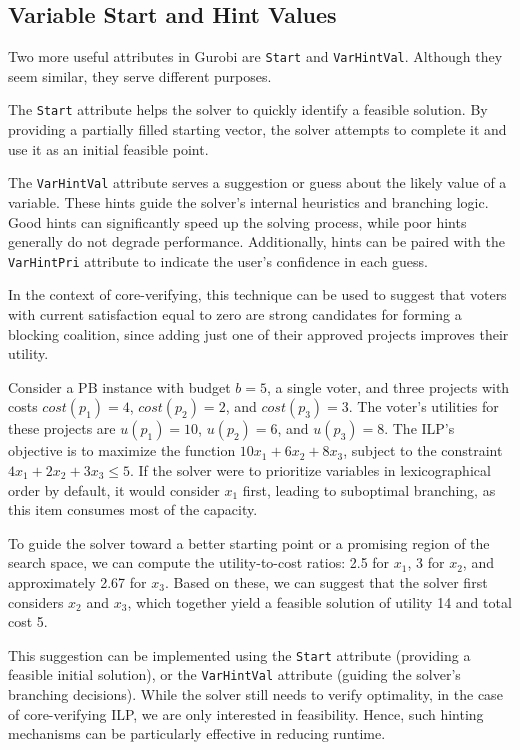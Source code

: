 \documentclass[magisterska,en]{pracamgr}
\begin{document}
\subsection{Variable Start and Hint Values}

Two more useful attributes in Gurobi are \texttt{Start} and \texttt{VarHintVal}. Although they seem similar, they serve different purposes.

The \texttt{Start} attribute helps the solver to quickly identify a feasible solution. By providing a partially filled starting vector, the solver attempts to complete it and use it as an initial feasible point.

The \texttt{VarHintVal} attribute serves a suggestion or guess about the likely value of a variable. These hints guide the solver's internal heuristics and branching logic. Good hints can significantly speed up the solving process, while poor hints generally do not degrade performance. Additionally, hints can be paired with the \texttt{VarHintPri} attribute to indicate the user's confidence in each guess.

In the context of core-verifying, this technique can be used to suggest that voters with current satisfaction equal to zero are strong candidates for forming a blocking coalition, since adding just one of their approved projects improves their utility.

Consider a PB instance with budget $b=5$, a single voter, and three projects with costs $cost(p_1)=4$, $cost(p_2)=2$, and $cost(p_3)=3$. The voter's utilities for these projects are $u(p_1)=10$, $u(p_2)=6$, and $u(p_3)=8$. The ILP's objective is to maximize the function $10x_1+6x_2+8x_3$, subject to the constraint $4x_1+2x_2+3x_3\leq5$. If the solver were to prioritize variables in lexicographical order by default, it would consider $x_1$ first, leading to suboptimal branching, as this item consumes most of the capacity.

To guide the solver toward a better starting point or a promising region of the search space, we can compute the utility-to-cost ratios: 2.5 for $x_1$, 3 for $x_2$, and approximately 2.67 for $x_3$. Based on these, we can suggest that the solver first considers $x_2$ and $x_3$, which together yield a feasible solution of utility 14 and total cost 5.

This suggestion can be implemented using the \texttt{Start} attribute (providing a feasible initial solution), or the \texttt{VarHintVal} attribute (guiding the solver's branching decisions). While the solver still needs to verify optimality, in the case of core-verifying ILP, we are only interested in feasibility. Hence, such hinting mechanisms can be particularly effective in reducing runtime.
\end{document}

